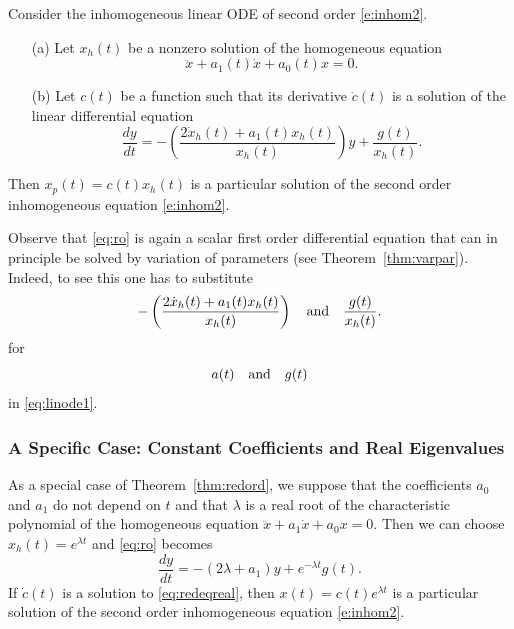 \documentclass{ximera}
\begin{document}
\begin{theorem}  \label{thm:redord}
Consider the inhomogeneous linear ODE of second order \eqref{e:inhom2}.
\begin{itemize}
\item[(a)] Let $x_h(t)$ be a nonzero solution of the homogeneous equation
\[
\ddot{x} + a_1(t)\dot{x} + a_0(t)x = 0.
\]
\item[(b)] Let $c(t)$ be a function such that its derivative 
$\dot c(t)$ is a solution of the linear differential equation
\begin{equation}  \label{eq:ro}
\frac{dy}{dt} = -\left(\frac{2\dot x_h(t)+a_1(t) x_h(t)}{x_h(t)}\right)y
+\frac{g(t)}{x_h(t)}.
\end{equation}
\end{itemize}
Then $x_p(t)=c(t) x_h(t)$ is a particular 
solution of the second
order inhomogeneous equation \eqref{e:inhom2}.
\end{theorem}

Observe that \eqref{eq:ro} is again a scalar first order differential
equation that can in principle be solved by variation of 
parameters (see Theorem~\ref{thm:varpar}).
Indeed, to see this one has to substitute
\[
 -\left(\frac{2\dot x_h(t)+a_1(t) x_h(t)}{x_h(t)}\right)
\quad\mbox{and}\quad \frac{g(t)}{x_h(t)}.
\]
for
\[
a(t) \quad\mbox{and}\quad g(t)
\]
in \eqref{eq:linode1}.




\subsubsection*{A Specific Case: Constant Coefficients and Real Eigenvalues}

As a special case of Theorem~\ref{thm:redord}, we suppose that 
the coefficients $a_0$ and $a_1$ do not depend on $t$ and that $\lambda$ is a
real root of the characteristic 
polynomial 
of the homogeneous equation
$\ddot{x} + a_1\dot{x} + a_0x = 0$.  Then we can choose $x_h(t)=e^{\lambda t}$
and \eqref{eq:ro} becomes
\begin{equation}  \label{eq:redeqreal}
\frac{dy}{dt} = -(2\lambda +a_1) y + e^{-\lambda t}g(t).
\end{equation}
If $\dot c(t)$ is a solution to \eqref{eq:redeqreal}, then
$x(t)=c(t) e^{\lambda t}$ is a particular 
solution 
of the second order inhomogeneous equation \eqref{e:inhom2}.
\end{document}
